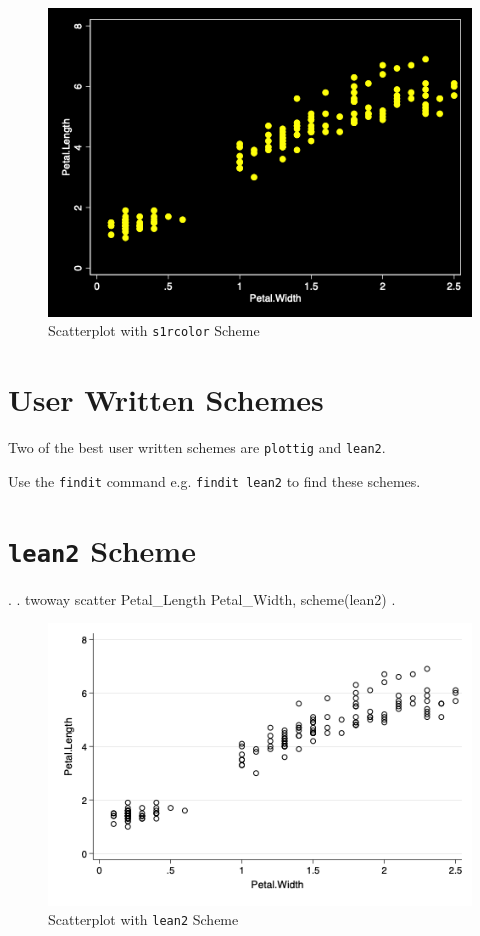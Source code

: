 \documentclass[]{article}
\begin{document}
\begin{figure}
\centering
\includegraphics[width=0.75\linewidth]{s1rcolorscatter.png}
\caption{Scatterplot with \texttt{s1rcolor} Scheme}
\end{figure}

\hypertarget{user-written-schemes}{%
\section{User Written Schemes}\label{user-written-schemes}}

Two of the best user written schemes are \texttt{plottig} and
\texttt{lean2}.

Use the \texttt{findit} command e.g. \texttt{findit\ lean2} to find
these schemes.

\hypertarget{lean2-scheme}{%
\section{\texorpdfstring{\texttt{lean2}
Scheme}{lean2 Scheme}}\label{lean2-scheme}}

\begin{stlog}
. 
. twoway scatter Petal_Length Petal_Width, scheme(lean2)
{\smallskip}
. 
\end{stlog}

\begin{stlog}


{\smallskip}

\end{stlog}

\begin{figure}
\centering
\includegraphics[width=0.75\linewidth]{lean2scatter.png}
\caption{Scatterplot with \texttt{lean2} Scheme}
\end{figure}
\end{document}
